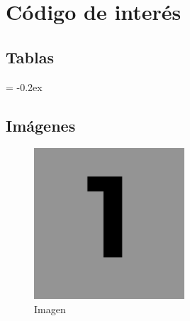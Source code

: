 
\chapter{Código de interés} \label{ch:código}

\section{Tablas} \label{sec:tablas}

    \begin{table}[H]
    \small
      \centering
        \extrarowheight = -0.2ex
        \renewcommand{\arraystretch}{1.75}
        \noindent{}
        \caption{Tabla}
      \label{tab:tabla}
    \end{table}

\section{Imágenes} \label{sec:imagenes}

    \begin{figure}[H]
    	\centering
    	\includegraphics[width=0.5\textwidth]{img/img1.png}
    	\caption{Imagen}
    	\label{fig:imagen}
    \end{figure}

